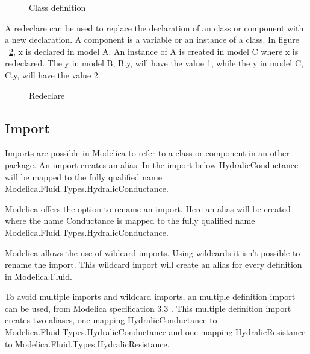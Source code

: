 \documentclass{cslthse-msc}
\begin{document}
\begin{figure}[H]
    \centering
    \subfloat{{}}
    \caption{Class definition}
    \label{fig:classDefinition}
\end{figure}

A redeclare can be used to replace the declaration of an class or component with a new declaration. A component is a variable or an instance of a class. In figure ~\ref{fig:redeclare}, x is declared in model A. An instance of A is created in model C where x is redeclared. The y in model B, B.y, will have the value 1, while the y in model C, C.y, will have the value 2.

\begin{figure}[H]
	
    \caption{Redeclare}
    \label{fig:redeclare}
\end{figure}

\subsection{Import}
Imports are possible in Modelica to refer to a class or component in an other package. An import creates an alias. In the import below HydralicConductance will be mapped to the fully qualified name Modelica.Fluid.Types.HydralicConductance.



Modelica offers the option to rename an import. Here an alias will be created where the name Conductance is mapped to the fully qualified name Modelica.Fluid.Types.HydralicConductance.



Modelica allows the use of wildcard imports. Using wildcards it isn't possible to rename the import. This wildcard import will create an alias for every definition in Modelica.Fluid.



To avoid multiple imports and wildcard imports, an multiple definition import can be used, from Modelica specification 3.3 \cite{modelicamodelica}. This multiple definition import creates two aliases, one mapping HydralicConductance to Modelica.Fluid.Types.HydralicConductance and one mapping HydralicResistance to Modelica.Fluid.Types.HydralicResistance.


\end{document}
